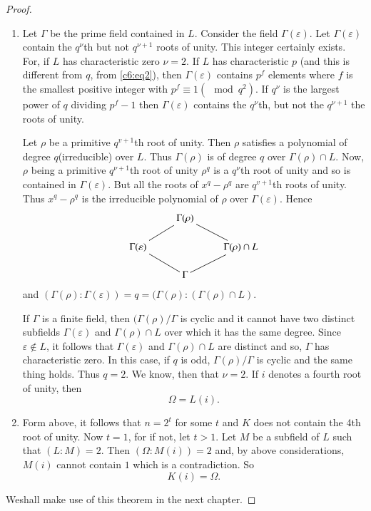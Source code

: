 \begin{proof}
\begin{enumerate}[1)]
\item Let $\Gamma$ be the prime field contained in $L$. Consider the
  field $\Gamma(\varepsilon)$. Let $\Gamma(\varepsilon)$ contain the
  $q^\nu$th but not $q^{\nu+1}$ roots of unity. This integer certainly
  exists. For, if $L$ has characteristic zero $\nu =2$. If $L$ has
  characteristic $p$ (and this is different from $q$, from \eqref{c6:eq2}), then
  $\Gamma(\varepsilon)$ contains $p^f$ elements where $f$ is the
  smallest positive integer with $p^f \equiv 1 (\mod q^2)$. If
  $q^{\nu}$ is the largest power of $q$ dividing $p^f-1$ then
  \pageoriginale $\Gamma(\varepsilon)$ contains the $q^{\nu}$th, but
  not the $q^{\nu+1}$ the roots of unity.  

Let $\rho$ be a primitive $q^{v+1}$th root of unity. Then $\rho$
satisfies a polynomial of degree $q$(irreducible) over $L$. Thus
$\Gamma(\rho)$ is of degree $q$ over $\Gamma(\rho) \cap L$. Now,
$\rho$ being a primitive $q^{\nu+1}$th root of unity $\rho^q$ is a
$q^{\nu}$th root of unity and so is contained in
$\Gamma(\varepsilon)$. But all the roots of $x^q-\rho^q$ are 
$q^{v+1}$th roots of unity. Thus $x^q - \rho^q$ is the irreducible
polynomial of $\rho$ over $\Gamma(\varepsilon)$. Hence  
\[
\xymatrix@R=0.5cm{
& \Gamma(\rho) \ar@{-}[dl] \ar@{-}[dr] & \\
\Gamma (\varepsilon)\ar@{-}[dr] & & \Gamma(\rho) \cap L \ar@{-}[dl]\\
& \Gamma & 
}
\]
and $(\Gamma(\rho):\Gamma(\varepsilon))=q=(\Gamma(\rho):(\Gamma(\rho) 
\cap L)$.  

If $\Gamma$ is a finite field, then $(\Gamma(\rho)/{\Gamma}$ is
cyclic and it cannot have two distinct subfields
$\Gamma(\varepsilon)$ and $\Gamma(\rho) \cap L$ over which it has
the same degree. Since $\varepsilon \notin L$, it follows that
$\Gamma(\varepsilon)$ and $\Gamma(\rho) \cap L$ are distinct and so,
$\Gamma$ has characteristic zero. In this case, if $q$ is odd,
$\Gamma(\rho)/\Gamma$ is cyclic and the same thing holds. Thus
$q=2$. We know, then that $\nu =2$. If $i$ denotes a fourth root of
unity, then 
$$
\Omega =L(i). 
$$

\item Form above, it follows that $n=2^t$ for some $t$ and $K$ does
  not contain the 4th root of unity. Now $t=1$, for if not, let
  $t>1$. Let $M$ be a subfield of $L$ such that $(L:M)=2$. Then
  $(\Omega:M(i))=2$ and, by above considerations, $M(i)$ cannot
  contain $1$ which is a contradiction. So 
$$
K(i) = \Omega.
$$
\end{enumerate}

We\pageoriginale shall make use of this theorem in the next chapter. 
\end{proof}


